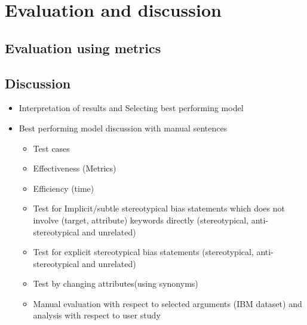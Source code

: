\chapter{Evaluation and discussion}

\section{Evaluation using metrics}

\section{Discussion}
\begin{itemize}
    \item Interpretation of results and Selecting best performing model 
    \item Best performing model discussion with manual sentences 
    \begin{itemize}
        \item Test cases 
        \item Effectiveness (Metrics)
        \item Efficiency (time)
        \item Test for Implicit/subtle stereotypical bias statements which does not involve (target, attribute) keywords directly  (stereotypical, anti-stereotypical and unrelated)
        \item Test for explicit stereotypical bias statements  (stereotypical, anti-stereotypical and unrelated)
        \item Test by changing attributes(using synonyms)
        \item Manual evaluation with respect to selected arguments (IBM dataset) and analysis with respect to user study 
    \end{itemize}
\end{itemize}